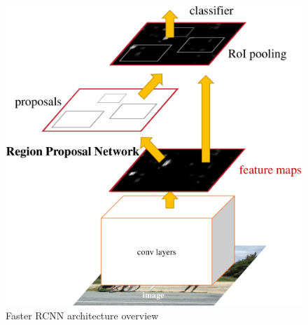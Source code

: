 \begin{figure}[h]
    \centering
    \includegraphics[page=1,width=\linewidth]{images/fasterrcnn.pdf}
    \caption{Faster RCNN architecture overview \cite{ren2016fasterrcnn}}
    \label{fig:fasterrcnn}
\end{figure}
